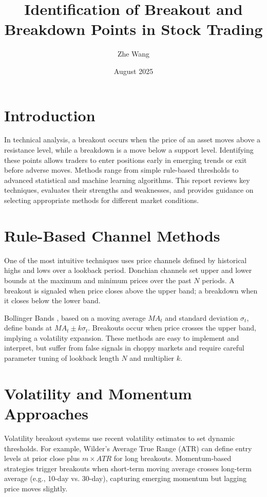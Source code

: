 \documentclass{article}
\title{Identification of Breakout and Breakdown Points in Stock Trading}
\author{Zhe Wang}
\date{August 2025}
\begin{document}
\maketitle

\section{Introduction}
In technical analysis, a breakout occurs when the price of an asset moves above a resistance level, while a breakdown is a move below a support level. Identifying these points allows traders to enter positions early in emerging trends or exit before adverse moves. Methods range from simple rule-based thresholds to advanced statistical and machine learning algorithms. This report reviews key techniques, evaluates their strengths and weaknesses, and provides guidance on selecting appropriate methods for different market conditions.

\section{Rule-Based Channel Methods}
One of the most intuitive techniques uses price channels defined by historical highs and lows over a lookback period. Donchian channels \cite{donchian1960} set upper and lower bounds at the maximum and minimum prices over the past $N$ periods. A breakout is signaled when price closes above the upper band; a breakdown when it closes below the lower band.

Bollinger Bands \cite{bollinger2002}, based on a moving average $MA_t$ and standard deviation $\sigma_t$, define bands at $MA_t \pm k\sigma_t$. Breakouts occur when price crosses the upper band, implying a volatility expansion. These methods are easy to implement and interpret, but suffer from false signals in choppy markets and require careful parameter tuning of lookback length $N$ and multiplier $k$.

\section{Volatility and Momentum Approaches}
Volatility breakout systems use recent volatility estimates to set dynamic thresholds. For example, Wilder's Average True Range (ATR) \cite{wilder1978} can define entry levels at prior close plus $m\times ATR$ for long breakouts. Momentum-based strategies trigger breakouts when short-term moving average crosses long-term average (e.g., 10-day vs.
30-day), capturing emerging momentum but lagging price moves slightly.
\end{document}
